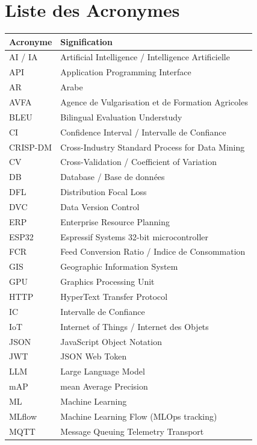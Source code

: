 \tableofcontents
\listoffigures
\listoftables

\chapter*{Liste des Acronymes}
\begin{longtable}{lp{10cm}}
\toprule
\textbf{Acronyme} & \textbf{Signification} \\
\midrule
\endhead
AI / IA & Artificial Intelligence / Intelligence Artificielle \\
API & Application Programming Interface \\
AR & Arabe \\
AVFA & Agence de Vulgarisation et de Formation Agricoles \\
BLEU & Bilingual Evaluation Understudy \\
CI & Confidence Interval / Intervalle de Confiance \\
CRISP-DM & Cross-Industry Standard Process for Data Mining \\
CV & Cross-Validation / Coefficient of Variation \\
DB & Database / Base de données \\
DFL & Distribution Focal Loss \\
DVC & Data Version Control \\
ERP & Enterprise Resource Planning \\
ESP32 & Espressif Systems 32-bit microcontroller \\
FCR & Feed Conversion Ratio / Indice de Consommation \\
GIS & Geographic Information System \\
GPU & Graphics Processing Unit \\
HTTP & HyperText Transfer Protocol \\
IC & Intervalle de Confiance \\
IoT & Internet of Things / Internet des Objets \\
JSON & JavaScript Object Notation \\
JWT & JSON Web Token \\
LLM & Large Language Model \\
mAP & mean Average Precision \\
ML & Machine Learning \\
MLflow & Machine Learning Flow (MLOps tracking) \\
MQTT & Message Queuing Telemetry Transport \\

\end{longtable}
